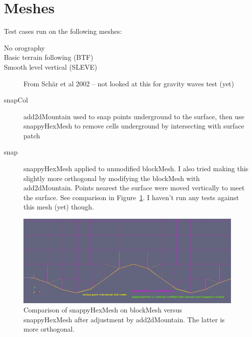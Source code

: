\section{Meshes}

Test cases run on the following meshes:
\begin{description}
\item[No orography]
\item[Basic terrain following (BTF)]
\item[Smooth level vertical (SLEVE)]{From Sch{\"a}r et al 2002 -- not looked at this for gravity waves test (yet)}
\item[snapCol]{add2dMountain used to snap points underground to the surface, then use snappyHexMesh to remove cells underground by intersecting with surface patch}
\item[snap]{snappyHexMesh applied to unmodified blockMesh.  I also tried making this slightly more orthogonal by modifying the blockMesh with add2dMountain.  Points nearest the surface were moved vertically to meet the surface.  See comparison in Figure~\ref{fig:snap-mesh-compare}.  I haven't run any tests against this mesh (yet) though.}
\end{description}

\begin{figure}
\includegraphics[width=\textwidth]{interim-results/cutCellWarpToSurfaceSchaerExp.png}
\caption{Comparison of snappyHexMesh on blockMesh versus snappyHexMesh after adjustment by add2dMountain.  The latter is more orthogonal.}
\label{fig:snap-mesh-compare}
\end{figure}
